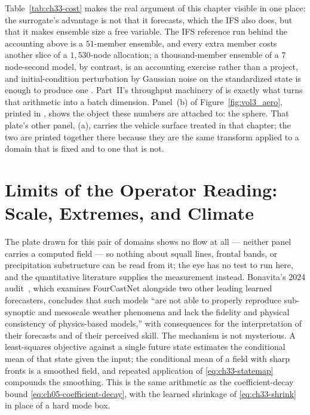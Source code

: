 Table~\ref{tab:ch33-cost} makes the real argument of this chapter visible in one place: the
surrogate's advantage is not that it forecasts, which the IFS also does, but that it makes
ensemble size a free variable. The IFS reference run behind the accounting above is a
$51$-member ensemble, and every extra member costs another slice of a $1{,}530$-node
allocation; a thousand-member ensemble of a $7$ node-second model, by contrast, is an
accounting exercise rather than a project, and initial-condition perturbation by Gaussian
noise on the standardized state is enough to produce one \cite{pathak2022fourcastnet}.
Part~II's
throughput machinery of  is
exactly what turns that arithmetic into a batch dimension. Panel~(b) of
Figure~\ref{fig:vol3_aero}, printed in ,
shows the object these numbers are attached to: the sphere. That plate's other panel,
(a), carries the vehicle surface treated in that chapter; the two are printed
together there because they are the same transform applied to a domain that is fixed
and to one that is not.


\section{Limits of the Operator Reading: Scale, Extremes, and Climate}
\label{sec:ch33-limits}

The plate drawn for this pair of domains shows no flow at all --- neither panel
carries a computed field --- so nothing about squall lines, frontal bands, or
precipitation substructure can be read from it; the eye has no test to run here,
and the quantitative literature supplies the measurement instead. Bonavita's 2024
audit~\cite{bonavita2024limitations}, which examines FourCastNet alongside two
other leading learned forecasters, concludes that such models ``are not
able to properly reproduce sub-synoptic and mesoscale weather phenomena and lack the
fidelity and physical consistency of physics-based models,'' with consequences for the
interpretation of their forecasts and of their perceived skill. The mechanism is not
mysterious. A least-squares objective against a single future state estimates the conditional
mean of
that state given the input; the conditional mean of a field with sharp fronts is a smoothed
field, and repeated application of \eqref{eq:ch33-statemap} compounds the smoothing. This
is the same arithmetic as the coefficient-decay bound \eqref{eq:ch05-coefficient-decay},
with the learned shrinkage of \eqref{eq:ch33-shrink} in place of a hard mode box.

